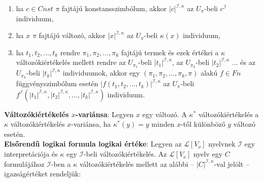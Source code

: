 \documentclass[margin=0px]{article}
\begin{document}
 	\begin{enumerate}
 		\item	ha $c \in Cnst$ $\pi$ fajtájú konstansszimbólum, akkor $|c|^{\mathcal{I},\kappa}$ az $U_{\pi}$-beli
 		$c^{\mathcal{I}}$ individuum,
 		
 		\item	ha $x$ $\pi$ fajtájú változó, akkor $|x|^{\mathcal{I},\kappa}$ az $U_{\pi}$-beli $\kappa(x)$ individuum,
 		
 		\item	ha $t_{1}, t_{2}, ..., t_{k}$ rendre $\pi_{1}, \pi_{2}, ..., \pi_{k}$ fajtájú termek és ezek értékei
 		a $\kappa$ változókiértékelés mellett rendre az $U_{\pi_{1}}$-beli $|t_{1}|^{\mathcal{I},\kappa}$, az
 		$U_{\pi_{2}}$-beli $|t_{2}|^{\mathcal{I},\kappa}$ ... és az $U_{\pi_{k}}$-beli $|t_{k}|^{\mathcal{I},\kappa}$
 		individuumok, akkor egy $(\pi_{1}, \pi_{2}, ..., \pi_{k}, \pi)$ alakú $f \in Fn$ függvényszimbólum esetén
 		$|f(t_{1}, t_{2}, ..., t_{k})|^{\mathcal{I},\kappa}$ az $U_{\pi}$-beli
 		$f^{\mathcal{I}}(|t_{1}|^{\mathcal{I},\kappa}, |t_{2}|^{\mathcal{I},\kappa}, ..., |t_{k}|^{\mathcal{I},\kappa})$
 		individuum.

 	\end{enumerate}
 	
 	\noindent \textbf{Változókiértékelés $x$-variánsa}: Legyen $x$ egy változó. A $\kappa^{*}$ változókiértékelés a
 	$\kappa$ változókiértékelés $x$-variánsa, ha $\kappa^{*}(y) = y$ minden $x$-től különböző $y$ változó esetén.\\
 	
 	\noindent \textbf{Elsőrendű logikai formula logikai értéke}:
 	Legyen az $\mathcal{L}[V_{\nu}]$ nyelvnek $\mathcal{I}$ egy interpretációja és $\kappa$ egy $\mathcal{I}$-beli
 	változókiértékelés. Az $\mathcal{L}[V_{\nu}]$ nyelv egy $C$ formulájához $\mathcal{I}$-ben a $\kappa$ változókiértékelés
 	mellett az alábbi -- $|C|^{\mathcal{I},\kappa}$-val jelölt -- igazságértéket rendeljük:
 	
\end{document}
